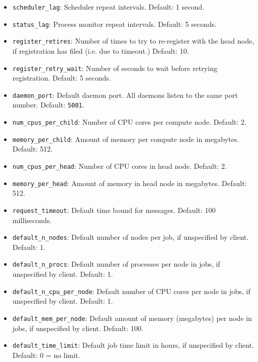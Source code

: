 \documentclass[sigconf]{acmart}
\begin{document}
\begin{itemize}
    \item \verb|scheduler_lag|: Scheduler repeat intervals. Default: 1 second.
    \item \verb|status_lag|: Process monitor repeat intervals. Default: 5 seconds.

    \item \verb|register_retires|: Number of times to try to re-register with the head node, if registration has filed (i.e. due
        to timeout.) Default: 10.
    \item \verb|register_retry_wait|: Number of seconds to wait before retrying registration. Default: 5 seconds.

    \item \verb|daemon_port|: Default daemon port. All daemons listen to the same port number. Default: \verb|5001|.

    \item \verb|num_cpus_per_child|: Number of CPU cores per compute node. Default: 2.
    \item \verb|memory_per_child|: Amount of memory per compute node in megabytes. Default: 512.

    \item \verb|num_cpus_per_head|: Number of CPU cores in head node. Default: 2.
    \item \verb|memory_per_head|: Amount of memory in head node in megabytes. Default: 512.

    \item \verb|request_timeout|: Default time bound for messages. Default: 100 milliseconds.

    \item \verb|default_n_nodes|: Default number of nodes per job, if unspecified by client. Default: 1.
    \item \verb|default_n_procs|: Default number of processes per node in jobs, if unspecified by client. Default: 1.
    \item \verb|default_n_cpu_per_node|: Default number of CPU cores per node in jobs, if unspecified by client. Default: 1.
    \item \verb|default_mem_per_node|: Default amount of memory (megabytes) per node in jobs, if unspecified by client. Default: 100.
    \item \verb|default_time_limit|: Default job time limit in hours, if unspecified by client. Default: 0 = no limit.

\end{itemize}
\end{document}
